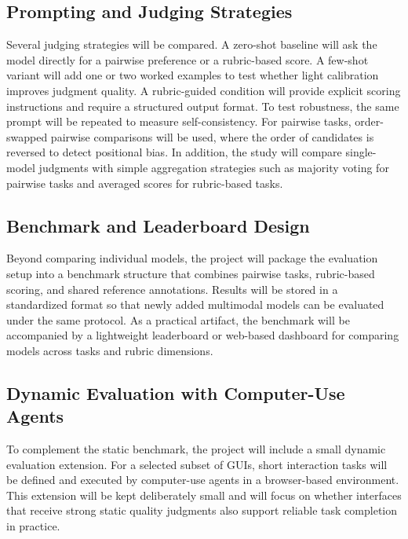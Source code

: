 \documentclass[pdflatex,sn-mathphys-num]{sn-jnl}
\begin{document}
\subsection{Prompting and Judging Strategies}

Several judging strategies will be compared. A zero-shot baseline will ask the model
directly for a pairwise preference or a rubric-based score. A few-shot variant will add
one or two worked examples to test whether light calibration improves judgment quality.
A rubric-guided condition will provide explicit scoring instructions and require a
structured output format. To test robustness, the same prompt will be repeated to
measure self-consistency. For pairwise tasks, order-swapped pairwise comparisons will
be used, where the order of candidates is reversed to detect positional bias. In
addition, the study will compare single-model judgments with simple aggregation
strategies such as majority voting for pairwise tasks and averaged scores for
rubric-based tasks.

\subsection{Benchmark and Leaderboard Design}

Beyond comparing individual models, the project will package the evaluation setup into
a benchmark structure that combines pairwise tasks, rubric-based scoring, and shared
reference annotations. Results will be stored in a standardized format so that newly
added multimodal models can be evaluated under the same protocol. As a practical
artifact, the benchmark will be accompanied by a lightweight leaderboard or web-based
dashboard for comparing models across tasks and rubric dimensions.

\subsection{Dynamic Evaluation with Computer-Use Agents}

To complement the static benchmark, the project will include a small dynamic evaluation
extension. For a selected subset of GUIs, short interaction tasks will be defined and
executed by computer-use agents in a browser-based environment. This extension will be
kept deliberately small and will focus on whether interfaces that receive strong static
quality judgments also support reliable task completion in practice.

\end{document}
